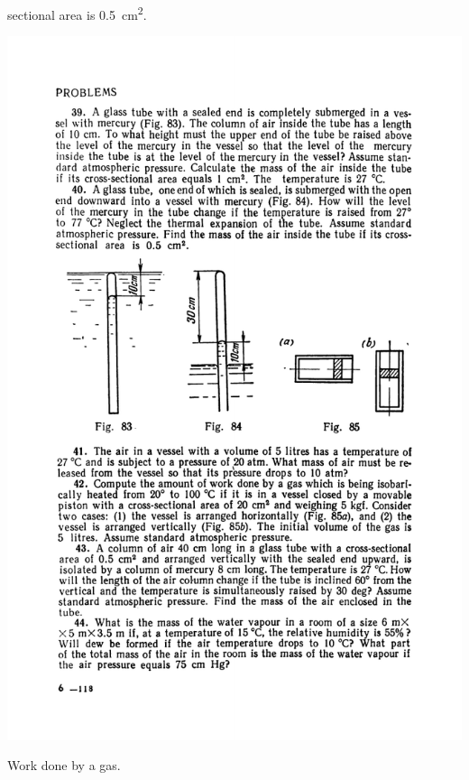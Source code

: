 \documentclass[a4paper,sfsidenotes]{tufte-book}
\begin{document}
\begin{enumerate}[resume=problems]
sectional area is \SI{0.5}{\centi\meter^{2}}.
\begin{marginfigure}%
\centering
\includegraphics[width=0.4\linewidth]{fig-084a}
\caption{Work done by a gas.}
\label{fig-84}
\end{marginfigure}


\end{enumerate}
\end{document}
